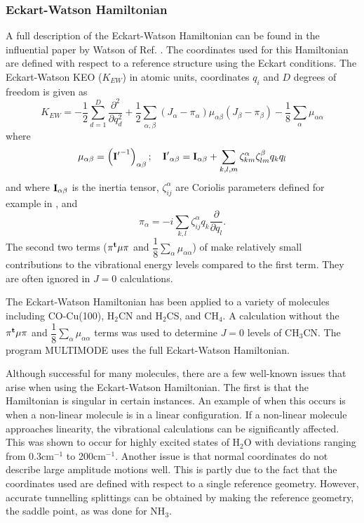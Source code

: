 \subsubsection{Eckart-Watson Hamiltonian} 
A full description of the Eckart-Watson Hamiltonian can be found in the influential paper by Watson of Ref. . The coordinates used for this Hamiltonian are defined with respect to a reference structure using the Eckart conditions\cite{Eckart1935}. The Eckart-Watson KEO ($K_{EW}$) in atomic units, coordinates $q_i$ and $D$ degrees of freedom is given as\cite{Bowman2008}
\begin{equation}\label{eq.ewham}
K_{EW}=-\dfrac{1}{2}\sum_{d=1}^D\dfrac{\partial^2}{\partial q_d^2}+
\dfrac{1}{2}\sum_{\alpha,\beta} \left(J_\alpha-\pi_{\alpha}\right)\mu_{\alpha\beta}
\left(J_\beta-\pi_{\beta}\right)
-\dfrac{1}{8}\sum_{\alpha}\mu_{\alpha \alpha}
\end{equation}
where
\begin{equation*}
\mu_{\alpha\beta}=\left({{\bf I'}}^{-1}\right)_{\alpha\beta};\quad
 {{\bf I'}}_{\alpha\beta}={{\bf I}}_{\alpha\beta}+\sum_{k,l,m}
 \zeta^{\alpha}_{km}\zeta^{\beta}_{lm}q_kq_l
\end{equation*}
and where ${{\bf I}}_{\alpha \beta}$ is the inertia tensor, $\zeta_{ij}^{\alpha}$ are Coriolis parameters defined for example in , and 
\begin{equation*}
\pi_{\alpha}=-i\sum_{k,l} \zeta_{ij}^{\alpha} q_k \dfrac{\partial}{\partial q_l}.
\end{equation*}
The second two terms (${{\bf \pi^t\mu\pi}}$ and $\dfrac{1}{8}\sum_{\alpha}\mu_{\alpha\alpha}$) of  make relatively small contributions to the vibrational energy levels compared to the first term.  They are often ignored in $J=0$ calculations.   


The Eckart-Watson Hamiltonian has been applied to a variety of molecules including CO-Cu(100)\cite{Carter1997},  H$_2$CN and H$_2$CS\cite{Carter1998}, and CH$_4$\cite{Matyus2007}.  A calculation without the ${{\bf \pi^t\mu\pi}}$ and $\dfrac{1}{8}\sum_{\alpha}\mu_{\alpha\alpha}$ terms was used to determine $J=0$ levels of CH$_3$CN\cite{Avila2011}.  The program MULTIMODE\cite{Carter1998} uses the full Eckart-Watson Hamiltonian.

Although successful for many molecules, there are a few well-known issues that arise when using the Eckart-Watson Hamiltonian.  The first is that the Hamiltonian is singular in certain instances\cite{Bowman2008}.  An example of when this occurs is when a non-linear molecule is in a linear configuration.  If a non-linear molecule approaches linearity, the vibrational calculations can be significantly affected. This was shown to occur for highly excited states of H$_2$O\cite{Carter1998b} with deviations ranging from 0.3cm$^{-1}$ to 200cm$^{-1}$.  Another issue is that normal coordinates do not describe large amplitude motions well\cite{Bowman2008}.  This is partly due to the fact that the coordinates used are defined with respect to a single reference geometry.  However, accurate tunnelling splittings can be obtained by making the reference geometry, the saddle point, as was done for NH$_3$\cite{Leonard2002}.  



